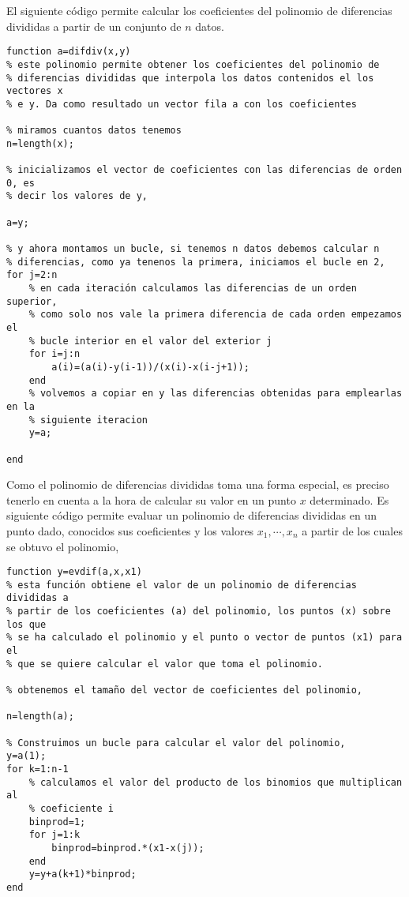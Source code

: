 El siguiente código permite calcular los coeficientes del polinomio de diferencias divididas a partir de un conjunto de $n$ datos.

\begin{lstlisting}
function a=difdiv(x,y)
% este polinomio permite obtener los coeficientes del polinomio de
% diferencias divididas que interpola los datos contenidos el los vectores x
% e y. Da como resultado un vector fila a con los coeficientes

% miramos cuantos datos tenemos
n=length(x);

% inicializamos el vector de coeficientes con las diferencias de orden 0, es
% decir los valores de y,

a=y;

% y ahora montamos un bucle, si tenemos n datos debemos calcular n
% diferencias, como ya tenenos la primera, iniciamos el bucle en 2,
for j=2:n
    % en cada iteración calculamos las diferencias de un orden superior,
    % como solo nos vale la primera diferencia de cada orden empezamos el
    % bucle interior en el valor del exterior j
    for i=j:n
        a(i)=(a(i)-y(i-1))/(x(i)-x(i-j+1));
    end
    % volvemos a copiar en y las diferencias obtenidas para emplearlas en la
    % siguiente iteracion
    y=a;
    
end
\end{lstlisting}

Como el polinomio de diferencias divididas toma una forma especial, es preciso tenerlo en cuenta a la hora de calcular su valor en un punto $x$ determinado. Es siguiente código permite evaluar un polinomio de diferencias divididas en un punto dado, conocidos sus coeficientes y los valores $x_1,\cdots, x_n$ a partir de los cuales se obtuvo el polinomio,

\begin{lstlisting}
function y=evdif(a,x,x1)
% esta función obtiene el valor de un polinomio de diferencias divididas a
% partir de los coeficientes (a) del polinomio, los puntos (x) sobre los que
% se ha calculado el polinomio y el punto o vector de puntos (x1) para el
% que se quiere calcular el valor que toma el polinomio.

% obtenemos el tamaño del vector de coeficientes del polinomio,

n=length(a);

% Construimos un bucle para calcular el valor del polinomio,
y=a(1);
for k=1:n-1
    % calculamos el valor del producto de los binomios que multiplican al
    % coeficiente i
    binprod=1;
    for j=1:k
        binprod=binprod.*(x1-x(j));
    end
    y=y+a(k+1)*binprod;
end
\end{lstlisting}

